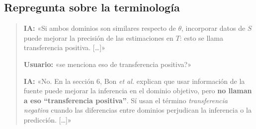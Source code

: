 \documentclass[10pt,a4paper]{article}
\begin{document}
\subsection*{Repregunta sobre la terminología}


\begin{quote}
\textbf{IA:} «Si ambos dominios son similares respecto de $\theta$, incorporar datos de $S$ puede mejorar la precisión de las estimaciones en $T$: esto se llama transferencia positiva. […]»

\textbf{Usuario:} «se menciona eso de transferencia positiva?»

\textbf{IA:} «No. En la sección 6, Bon \emph{et al.} explican que usar información de la fuente puede mejorar la inferencia en el dominio objetivo, pero \textbf{no llaman a eso “transferencia positiva”}. Sí usan el término \emph{transferencia negativa} cuando las diferencias entre dominios perjudican la inferencia o la predicción. […]»
\end{quote}
\end{document}
